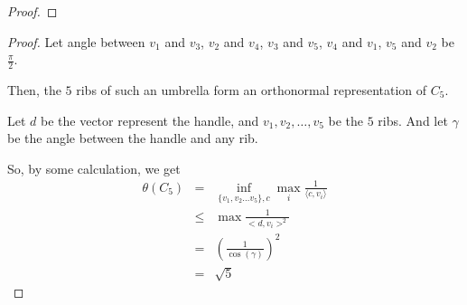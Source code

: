 \begin{frame}
\begin{proof}

      \end{proof}
\end{frame}

\begin{frame}
      \begin{proof}
            Let angle between $v_{1}$ and $v_{3}$, $v_{2}$ and $v_{4}$, $v_{3}$ and $v_{5}$, $v_{4}$ and $v_{1}$, $v_{5}$ and $v_{2}$ be $\frac{\pi}{2}$.

            Then, the $5$ ribs of such an umbrella form an orthonormal representation of $C_{5}$.

            Let $d$ be the vector represent the handle, and $v_{1},v_{2},\dots,v_{5}$ be the $5$ ribs. And let $\gamma$ be the angle between the handle and any rib.

            So, by some calculation, we get
            \begin{eqnarray}
                  \theta(C_{5}) &=& \inf_{\{v_{1},v_{2} \hdots v_{5}\},c} \max_{i} \frac{1}{\langle c, v_{i} \rangle} \\
                  &\le& \max \frac{1}{<d,v_{i}>^{2}} \\
                  &=& \left(
                        \frac{1}{\cos(\gamma)}
                  \right)^{2} \\
                  &=& \sqrt{5}
            \end{eqnarray}
      \end{proof}
\end{frame}
